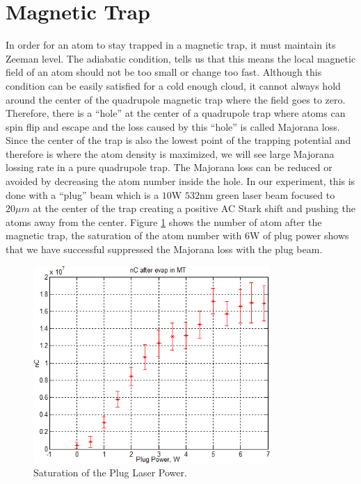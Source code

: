 \section{Magnetic Trap}\label{exp:mt}
In order for an atom to stay trapped in a magnetic trap, it must maintain its Zeeman level. The adiabatic condition, tells us that this means the local magnetic field of an atom should not be too small or change too fast. Although this condition can be easily satisfied for a cold enough cloud, it cannot always hold around the center of the quadrupole magnetic trap where the field goes to zero. Therefore, there is a ``hole'' at the center of a quadrupole trap where atoms can spin flip and escape and the loss caused by this ``hole'' is called Majorana loss. Since the center of the trap is also the lowest point of the trapping potential and therefore is where the atom density is maximized, we will see large Majorana lossing rate in a pure quadrupole trap. The Majorana loss can be reduced or avoided by decreasing the atom number inside the hole. In our experiment, this is done with a ``plug'' beam which is a $10$W $532$nm green laser beam focused to $20\mu m$ at the center of the trap creating a positive AC Stark shift and pushing the atoms away from the center. Figure \ref{exp:plug-power} shows the number of atom after the magnetic trap, the saturation of the atom number with $6$W of plug power shows that we have successful suppressed the Majorana loss with the plug beam.\\
\begin{figure}
  \begin{center}
    \includegraphics[width=9cm]{plug-power.png}
  \end{center}
  \caption{Saturation of the Plug Laser Power.}
  \label{exp:plug-power}
\end{figure}
\\
